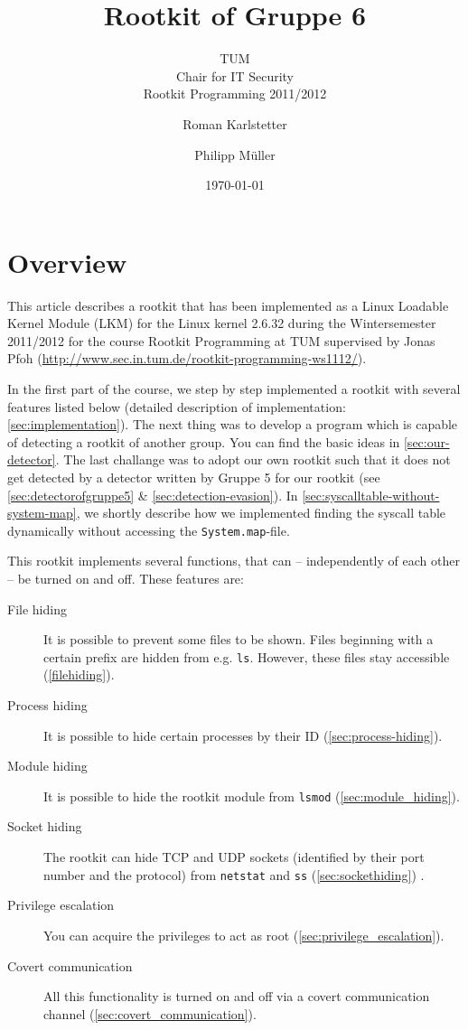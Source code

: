\documentclass[10pt, letterpaper]{scrartcl}
\title{Rootkit of Gruppe 6}
\subtitle{TUM \\Chair for IT Security\\  Rootkit Programming 2011/2012}
\author{Roman Karlstetter \and Philipp M\"uller}
\date{\today}
\begin{document}
\maketitle
\tableofcontents
\newpage

\section{Overview}
This article describes a rootkit that has been implemented as a Linux Loadable Kernel Module (LKM) for the Linux kernel 2.6.32 during the Wintersemester 2011/2012 for the course Rootkit Programming at TUM supervised by Jonas Pfoh (\url{http://www.sec.in.tum.de/rootkit-programming-ws1112/}). 

In the first part of the course, we step by step implemented a rootkit with several features listed below (detailed description of implementation: \autoref{sec:implementation}). The next thing was to develop a program which is capable of detecting a rootkit of another group. You can find the basic ideas in \autoref{sec:our-detector}. The last challange was to adopt our own rootkit such that it does not get detected by a detector written by Gruppe 5 for our rootkit (see \autoref{sec:detectorofgruppe5} \& \autoref{sec:detection-evasion}). In \autoref{sec:syscalltable-without-system-map}, we shortly describe how we implemented finding the syscall table dynamically without accessing the \texttt{System.map}-file.

This rootkit implements several functions, that can -- independently of each other -- be turned on and off. These features are:

\begin{description}
\item [File hiding] It is possible to prevent some files to be shown. Files beginning with a certain prefix are hidden from e.g. \texttt{ls}. However, these files stay accessible (\autoref{filehiding}).
\item [Process hiding] It is possible to hide certain processes by their ID (\autoref{sec:process-hiding}).
\item [Module hiding] It is possible to hide the rootkit module from \texttt{lsmod} (\autoref{sec:module_hiding}).
\item [Socket hiding] The rootkit can hide TCP and UDP sockets (identified by their port number and the protocol) from \texttt{netstat} and \texttt{ss} (\autoref{sec:sockethiding}) .
\item [Privilege escalation] You can acquire the privileges to act as root (\autoref{sec:privilege_escalation}).
\item [Covert communication] All this functionality is turned on and off via a covert communication channel (\autoref{sec:covert_communication}).
\end{description}
\end{document}
